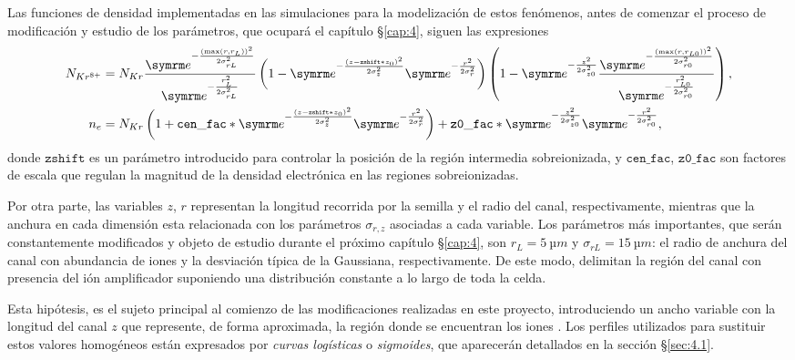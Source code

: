 Las funciones de densidad implementadas en las simulaciones para la modelización de estos fenómenos, antes de comenzar el proceso de modificación y estudio de los parámetros, que ocupará el capítulo \S\ref{cap:4}, siguen las expresiones
\begin{align}
  \label{eq:3.19a}
  N_{Kr^{8+}} &= N_{Kr}\frac{\eu^{-\frac{(\max(r,r_{L}))^{2}}{2 \sigma_{rL}^{2}}}}{\eu^{-\frac{r_{L}^{2}}{2 \sigma_{rL}^{2}}}}\left(1-\eu^{-\frac{(z-\mathtt{zshift}*z_{0})^{2}}{2 \sigma_{z}^{2}}}\eu^{-\frac{r^{2}}{2 \sigma_{r}^{2}}}\right)\left(1-\eu^{-\frac{z^{2}}{2 \sigma_{z0}^{2}}}\frac{\eu^{-\frac{(\max(r,r_{L0}))^{2}}{2 \sigma_{r0}^{2}}}}{\eu^{-\frac{r_{L0}^{2}}{2 \sigma_{r0}^{2}}}}\right), \\
  \label{eq:3.19b}
  n_{e} &= N_{Kr}\left(1+\mathtt{cen\_fac}*\eu^{-\frac{(z-\mathtt{zshift}*z_{0})^{2}}{2 \sigma_{z}^{2}}}\eu^{-\frac{r^{2}}{2 \sigma_{r}^{2}}}\right)+\mathtt{z0\_fac}*\eu^{-\frac{z^{2}}{2 \sigma_{z0}^{2}}}\eu^{-\frac{r^{2}}{2 \sigma_{r0}^{2}}},
\end{align}
donde $\mathtt{zshift}$ es un parámetro introducido para controlar la posición de la región intermedia sobreionizada, y $\mathtt{cen\_fac}$, $\mathtt{z0\_fac}$ son factores de escala que regulan la magnitud de la densidad electrónica en las regiones sobreionizadas. 

Por otra parte, las variables $z$, $r$ representan la longitud recorrida por la semilla y el radio del canal, respectivamente, mientras que la anchura en cada dimensión esta relacionada con los parámetros $\sigma_{r,z}$ asociadas a cada variable. Los parámetros más importantes, que serán constantemente modificados y objeto de estudio durante el próximo capítulo \S\ref{cap:4}, son $r_{L} = \qty{5}{µm}$ y $\sigma_{rL} = \qty{15}{µm}$: el radio de anchura del canal con abundancia de iones  y la desviación típica de la Gaussiana, respectivamente. De este modo, delimitan la región del canal con presencia del ión amplificador suponiendo una distribución constante a lo largo de toda la celda. 

Esta hipótesis, es el sujeto principal al comienzo de las modificaciones realizadas en este proyecto, introduciendo un ancho variable con la longitud del canal $z$ que represente, de forma aproximada, la región donde se encuentran los iones . Los perfiles utilizados para sustituir estos valores homogéneos están expresados por \emph{curvas logísticas} o \emph{sigmoides}, que aparecerán detallados en la sección \S\ref{sec:4.1}. 


